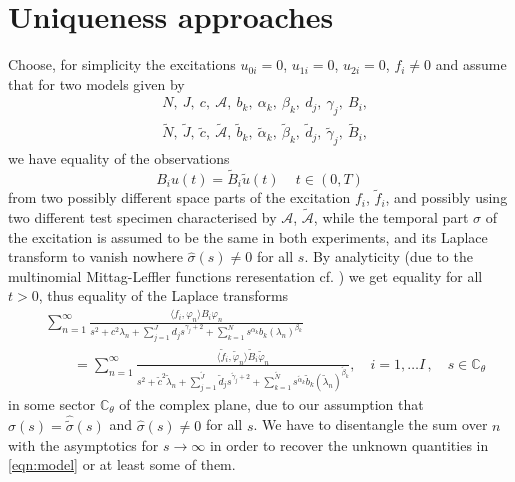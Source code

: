 \section{Uniqueness approaches}\label{sec:uniqueness}
Choose, for simplicity the excitations $u_{0i}=0$, $u_{1i}=0$, $u_{2i}=0$, $f_i\neq0$ and assume that 
for two models given by 
\begin{equation}\label{eqn:model}
\begin{aligned}
&N, \ J, \ c, \ \mathcal{A}, \ b_{k}, \ \alpha_k, \ \beta_{k}, \ d_j, \ \gamma_j,\ B_i,\\ 
&\tilde N, \ \tilde J, \ \tilde c, \ \tilde{\mathcal{A}}, \ \tilde{b}_{k}, \ \tilde{\alpha}_k, \ \tilde \beta_{k}, \ \tilde d_j, \ \tilde \gamma_j,\ \tilde B_i,
\end{aligned}
\end{equation}
we have equality of the observations
\[
B_i u(t) = \tilde B_i \tilde u(t)\, \quad t\in(0,T)
\]
from two possibly different space parts of the excitation $f_i$, $\tilde{f}_i$, and possibly using two different test specimen characterised by $\mathcal{A}$, $\tilde{\mathcal{A}}$,
while the temporal part $\sigma$ of the excitation is assumed to be the same in both experiments, and its Laplace transform to vanish nowhere $\hat{\sigma}(s)\neq0$ for all $s$.
By analyticity (due to the multinomial Mittag-Leffler functions reresentation cf. \cite[Theorem 4.1]{LuchkoGorenflo:1999})
we get equality for all $t>0$, thus equality of the Laplace transforms
\begin{equation}\label{eqn:BaBb}
\begin{aligned}
&\sum_{n=1}^\infty \frac{\langle f_{i},\varphi_n\rangle B_i\varphi_n}{
s^2+c^2\lambda_n+\sum_{j=1}^J d_j s^{\gamma_j+2}+\sum_{k=1}^N s^{\alpha_k} b_{k}(\lambda_n)^{\beta_{k}}}\\
&\qquad=
\sum_{n=1}^\infty \frac{\langle {\tilde f}_{i},{\tilde \varphi}_n\rangle {\tilde B}_i {\tilde \varphi}_n}{
s^2+{\tilde c}^2 {\tilde \lambda}_n+\sum_{j=1}^{\tilde{J}} \tilde{d}_j s^{\tilde{\gamma}_j+2}+\sum_{k=1}^{\tilde N} s^{{\tilde \alpha}_k} {\tilde b}_{k}({\tilde \lambda}_n)^{{\tilde \beta}_{k}}}, \quad i=1,\ldots I\,, \quad s\in\mathbb{C}_\theta
\end{aligned}
\end{equation}
in some sector $\mathbb{C}_\theta$ of the complex plane,
due to our assumption that $\hat{\sigma}(s)=\hat{\tilde{\sigma}}(s)$ and $\hat{\sigma}(s)\neq0$ for all $s$.
We have to disentangle the sum over $n$ with the asymptotics for $s\to\infty$ in order to recover the unknown quantities in \eqref{eqn:model} or at least some of them.

